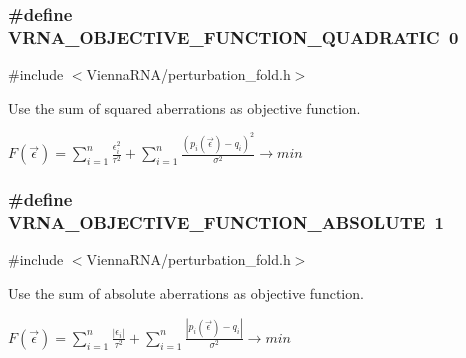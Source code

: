 \subsubsection[{V\+R\+N\+A\+\_\+\+O\+B\+J\+E\+C\+T\+I\+V\+E\+\_\+\+F\+U\+N\+C\+T\+I\+O\+N\+\_\+\+Q\+U\+A\+D\+R\+A\+T\+I\+C}]{\setlength{\rightskip}{0pt plus 5cm}\#define V\+R\+N\+A\+\_\+\+O\+B\+J\+E\+C\+T\+I\+V\+E\+\_\+\+F\+U\+N\+C\+T\+I\+O\+N\+\_\+\+Q\+U\+A\+D\+R\+A\+T\+I\+C~0}\label{group__soft__constraints_ga81e10993d1ae728e4e02022b33155a12}


{\ttfamily \#include $<$Vienna\+R\+N\+A/perturbation\+\_\+fold.\+h$>$}



Use the sum of squared aberrations as objective function. 

$ F(\vec\epsilon) = \sum_{i = 1}^n{ \frac{\epsilon_i^2}{\tau^2} } + \sum_{i = 1}^n{ \frac{(p_i(\vec\epsilon) - q_i)^2}{\sigma^2} } \to min $ \hypertarget{group__soft__constraints_gac070dfb9cafaeb14d5652bd9adf0f6b1}{}
\subsubsection[{V\+R\+N\+A\+\_\+\+O\+B\+J\+E\+C\+T\+I\+V\+E\+\_\+\+F\+U\+N\+C\+T\+I\+O\+N\+\_\+\+A\+B\+S\+O\+L\+U\+T\+E}]{\setlength{\rightskip}{0pt plus 5cm}\#define V\+R\+N\+A\+\_\+\+O\+B\+J\+E\+C\+T\+I\+V\+E\+\_\+\+F\+U\+N\+C\+T\+I\+O\+N\+\_\+\+A\+B\+S\+O\+L\+U\+T\+E~1}\label{group__soft__constraints_gac070dfb9cafaeb14d5652bd9adf0f6b1}


{\ttfamily \#include $<$Vienna\+R\+N\+A/perturbation\+\_\+fold.\+h$>$}



Use the sum of absolute aberrations as objective function. 

$ F(\vec\epsilon) = \sum_{i = 1}^n{ \frac{|\epsilon_i|}{\tau^2} } + \sum_{i = 1}^n{ \frac{|p_i(\vec\epsilon) - q_i|}{\sigma^2} } \to min $ \hypertarget{group__soft__constraints_gab1d89db58e8c497795a5005f5dbc8c4a}{}
